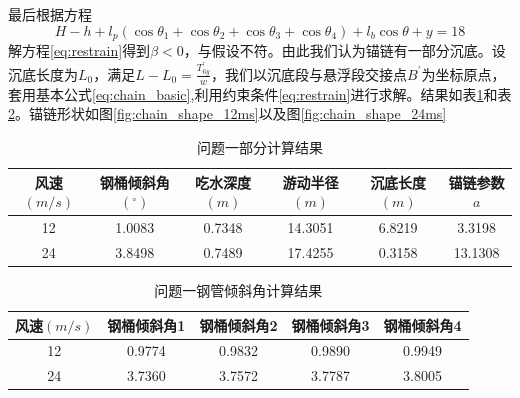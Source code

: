 \documentclass{cumcm}
\begin{document}
最后根据方程
\begin{equation}
H-h+l_p(\cos{\theta_1}+\cos{\theta_2}+\cos{\theta_3}+\cos{\theta_4})+l_b\cos{\theta}+y=18
\label{eq:restrain}
\end{equation}
解方程\ref{eq:restrain}得到$\beta<0$，与假设不符。由此我们认为锚链有一部分沉底。设沉底长度为$L_0$，满足$L-L_0=\frac{T_{6y}^{'}}{w}$，我们以沉底段与悬浮段交接点$B^{'}$为坐标原点，套用基本公式\ref{eq:chain_basic},利用约束条件\ref{eq:restrain}进行求解。结果如表\ref{table:result_1}和表\ref{table:pipe_angle}。锚链形状如图\ref{fig:chain_shape_12ms}以及图\ref{fig:chain_shape_24ms}

\begin{table}[!htp]
\centering
\caption{问题一部分计算结果}\label{table:result_1}
\centering
	\begin{tabular*}{\textwidth}{cccccc}
	
		\hline
		风速$(m/s)$ & 钢桶倾斜角$(^\circ)$ & 吃水深度$(m)$ & 游动半径$(m)$ & 沉底长度$(m)$ & 锚链参数$a$\\
		\hline
		12 & 1.0083 & 0.7348 & 14.3051 & 6.8219 & 3.3198\\
		24 & 3.8498 & 0.7489 & 17.4255 & 0.3158 & 13.1308\\
		\hline
	\end{tabular*}
\end{table}
\begin{table}[H]
\centering
\caption{问题一钢管倾斜角计算结果}
\label{table:pipe_angle}
	\begin{tabular*}{0.85\textwidth}{ccccc}
		\hline
		风速$(m/s)$ & 钢桶倾斜角1 & 钢桶倾斜角2 & 钢桶倾斜角3 & 钢桶倾斜角4\\
		\hline
		12 & 0.9774 & 0.9832 & 0.9890 & 0.9949\\
		24 & 3.7360 & 3.7572 & 3.7787 & 3.8005\\
		\hline
	\end{tabular*}
\end{table}
\end{document}
